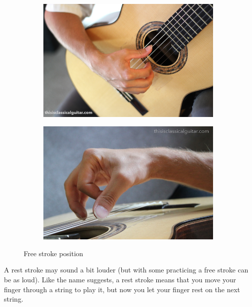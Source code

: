 \begin{figure}[h]
  \begin{subfigure}[b]{0.45\textwidth}
    \includegraphics[width=\textwidth]{../../Images/Bradford-right-hand-close-2016.jpg}
    \caption{}
    \label{fig:}
  \end{subfigure}
  \hfill
  \begin{subfigure}[b]{0.45\textwidth}
    \includegraphics[width=\textwidth]{../../Images/brad-right-stroke-2016.jpg}
    \caption{}
    \label{fig:}
  \end{subfigure}
  \caption{Free stroke position \cite{FreeStrokePositionBradlyWerner}}
  \label{fig:free_stoke_hand_position}
\end{figure}

A rest stroke may sound a bit louder (but with some practicing a free stroke can be as loud). Like the name suggests, a rest stroke means that you move your finger through a string to play it, but now you let your finger rest on the next string.

